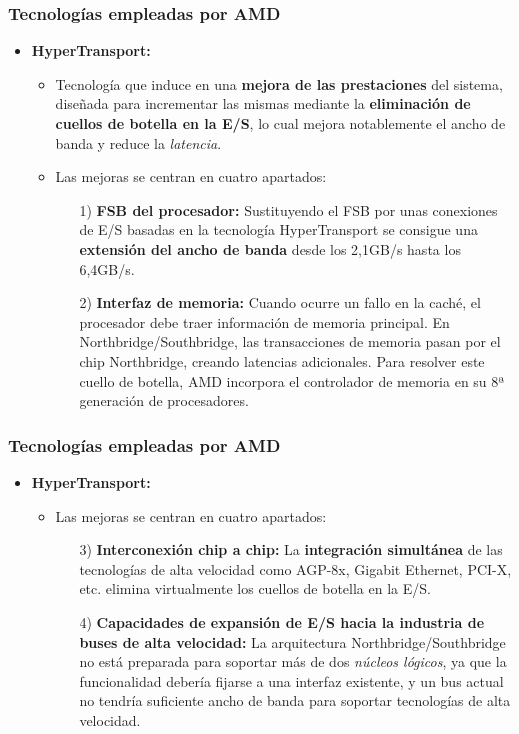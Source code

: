 \frame
{
\frametitle{Tecnologías empleadas por AMD}
\begin{itemize}
 \item \textbf{HyperTransport:}

	\begin{itemize}
		\item Tecnología que induce en una \textbf{mejora de las prestaciones} del sistema, diseñada para incrementar las mismas mediante la \textbf{eliminación de cuellos de botella en la E/S}, lo cual mejora notablemente el ancho de banda y reduce la \textit{latencia}. 

		\item Las mejoras se centran en cuatro apartados:

		\begin{itemize}
		 \item[1)] \textbf{FSB del procesador:} Sustituyendo el FSB por unas conexiones de E/S basadas en la tecnología HyperTransport se consigue una \textbf{extensión del ancho de banda} desde los 2,1GB/s hasta los 6,4GB/s.

		 \item[2)] \textbf{Interfaz de memoria:} Cuando ocurre un fallo en la caché, el procesador debe traer información de memoria principal. En Northbridge/Southbridge, las transacciones de memoria pasan por el chip Northbridge, creando latencias adicionales. Para resolver este cuello de botella, AMD incorpora el controlador de memoria en su 8ª generación de procesadores. 

		\end{itemize}
	\end{itemize}
\end{itemize}
}

\frame
{
\frametitle{Tecnologías empleadas por AMD}
\begin{itemize}
 \item \textbf{HyperTransport:}

	\begin{itemize}
		\item Las mejoras se centran en cuatro apartados:

		\begin{itemize}
		 \item[3)] \textbf{Interconexión chip a chip:} La \textbf{integración simultánea} de las tecnologías de alta velocidad como AGP-8x, Gigabit Ethernet, PCI-X, etc. elimina virtualmente los cuellos de botella en la E/S.

		 \item[4)] \textbf{Capacidades de expansión de E/S hacia la industria de buses de alta velocidad:} La arquitectura Northbridge/Southbridge no está preparada para soportar más de dos \textit{núcleos lógicos}, ya que la funcionalidad debería fijarse a una interfaz existente, y un bus actual no tendría suficiente ancho de banda para soportar tecnologías de alta velocidad.
		\end{itemize}
	\end{itemize}
\end{itemize}
}

